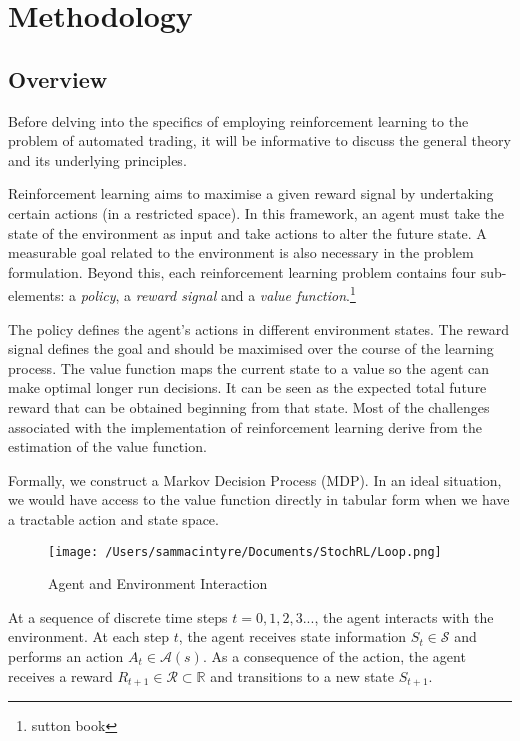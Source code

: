 \documentclass[12pt]{article}
\begin{document}
\section{Methodology}
\subsection{Overview}
Before delving into the specifics of employing reinforcement learning to the problem of automated trading, it will be informative to discuss the general theory and its underlying principles. 

Reinforcement learning aims to maximise a given reward signal by undertaking certain actions (in a restricted space). In this framework, an agent must take the state of the environment as input and take actions to alter the future state. A measurable goal related to the environment is also necessary in the problem formulation. Beyond this, each reinforcement learning problem contains four sub-elements: a \textit{policy}, a \textit{reward signal} and a \textit{value function}.\footnote{sutton book }

The policy defines the agent's actions in different environment states. The reward signal defines the goal and should be maximised over the course of the learning process. The value function maps the current state to a value so the agent can make optimal longer run decisions. It can be seen as the expected total future reward that can be obtained beginning from that state. Most of the challenges associated with the implementation of reinforcement learning derive from the estimation of the value function.

Formally, we construct a Markov Decision Process (MDP).
In an ideal situation, we would have access to the value function directly in tabular form when we have a tractable action and state space.

\begin{figure}
	\texttt{[image: /Users/sammacintyre/Documents/StochRL/Loop.png]}
	\caption{Agent and Environment Interaction}
	\label{fig:1}
\end{figure}

At a sequence of discrete time steps $t = 0,1,2,3...$, the agent interacts with the environment. At each step $t$, the agent receives state information $S _ { t } \in \mathcal{S}$ and performs an action $A _ { t } \in \mathcal { A } ( s )$. As a consequence of the action, the agent receives a reward $R _ { t + 1 } \in \mathcal { R } \subset \mathbb { R }$ and transitions to a new state $S _ { t + 1 }$.
\end{document}
